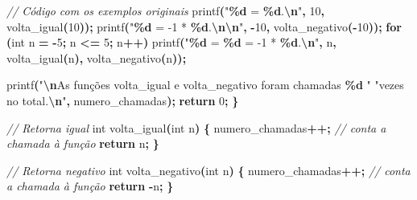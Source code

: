 \documentclass[
  11pt,
  a4paper,
]{scrbook}
\newenvironment{Shaded}{\begin{snugshade}}{\end{snugshade}}
\newcommand{\CommentTok}[1]{\textcolor[rgb]{0.56,0.35,0.01}{\textit{#1}}}
\newcommand{\ControlFlowTok}[1]{\textcolor[rgb]{0.13,0.29,0.53}{\textbf{#1}}}
\newcommand{\DataTypeTok}[1]{\textcolor[rgb]{0.13,0.29,0.53}{#1}}
\newcommand{\DecValTok}[1]{\textcolor[rgb]{0.00,0.00,0.81}{#1}}
\newcommand{\NormalTok}[1]{#1}
\newcommand{\OperatorTok}[1]{\textcolor[rgb]{0.81,0.36,0.00}{\textbf{#1}}}
\newcommand{\SpecialCharTok}[1]{\textcolor[rgb]{0.81,0.36,0.00}{\textbf{#1}}}
\newcommand{\StringTok}[1]{\textcolor[rgb]{0.31,0.60,0.02}{#1}}
\begin{document}
\begin{Shaded}
\begin{Highlighting}[]
    \CommentTok{// Código com os exemplos originais}
\NormalTok{    printf}\OperatorTok{(}\StringTok{"}\SpecialCharTok{\%d}\StringTok{ = }\SpecialCharTok{\%d}\StringTok{.}\SpecialCharTok{\textbackslash{}n}\StringTok{"}\OperatorTok{,} \DecValTok{10}\OperatorTok{,}\NormalTok{ volta\_igual}\OperatorTok{(}\DecValTok{10}\OperatorTok{));}
\NormalTok{    printf}\OperatorTok{(}\StringTok{"}\SpecialCharTok{\%d}\StringTok{ = {-}1 * }\SpecialCharTok{\%d}\StringTok{.}\SpecialCharTok{\textbackslash{}n\textbackslash{}n}\StringTok{"}\OperatorTok{,} \OperatorTok{{-}}\DecValTok{10}\OperatorTok{,}\NormalTok{ volta\_negativo}\OperatorTok{({-}}\DecValTok{10}\OperatorTok{));}
    \ControlFlowTok{for} \OperatorTok{(}\DataTypeTok{int}\NormalTok{ n }\OperatorTok{=} \OperatorTok{{-}}\DecValTok{5}\OperatorTok{;}\NormalTok{ n }\OperatorTok{\textless{}=} \DecValTok{5}\OperatorTok{;}\NormalTok{ n}\OperatorTok{++)}
\NormalTok{        printf}\OperatorTok{(}\StringTok{"}\SpecialCharTok{\%d}\StringTok{ = }\SpecialCharTok{\%d}\StringTok{ = {-}1 * }\SpecialCharTok{\%d}\StringTok{.}\SpecialCharTok{\textbackslash{}n}\StringTok{"}\OperatorTok{,}\NormalTok{ n}\OperatorTok{,}\NormalTok{ volta\_igual}\OperatorTok{(}\NormalTok{n}\OperatorTok{),}\NormalTok{ volta\_negativo}\OperatorTok{(}\NormalTok{n}\OperatorTok{));}

\NormalTok{    printf}\OperatorTok{(}\StringTok{"}\SpecialCharTok{\textbackslash{}n}\StringTok{As funções volta\_igual e volta\_negativo foram chamadas }\SpecialCharTok{\%d}\StringTok{ "}
           \StringTok{"vezes no total.}\SpecialCharTok{\textbackslash{}n}\StringTok{"}\OperatorTok{,}\NormalTok{ numero\_chamadas}\OperatorTok{);}
    \ControlFlowTok{return} \DecValTok{0}\OperatorTok{;}
\OperatorTok{\}}

\CommentTok{// Retorna igual}
\DataTypeTok{int}\NormalTok{ volta\_igual}\OperatorTok{(}\DataTypeTok{int}\NormalTok{ n}\OperatorTok{)} \OperatorTok{\{}
\NormalTok{    numero\_chamadas}\OperatorTok{++;}  \CommentTok{// conta a chamada à função}
    \ControlFlowTok{return}\NormalTok{ n}\OperatorTok{;}
\OperatorTok{\}}

\CommentTok{// Retorna negativo}
\DataTypeTok{int}\NormalTok{ volta\_negativo}\OperatorTok{(}\DataTypeTok{int}\NormalTok{ n}\OperatorTok{)} \OperatorTok{\{}
\NormalTok{    numero\_chamadas}\OperatorTok{++;}  \CommentTok{// conta a chamada à função}
    \ControlFlowTok{return} \OperatorTok{{-}}\NormalTok{n}\OperatorTok{;}
\OperatorTok{\}}
\end{Highlighting}
\end{Shaded}
\end{document}
